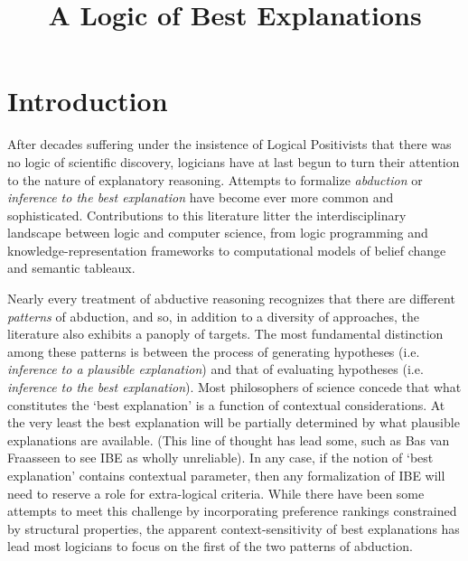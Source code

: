 \documentclass{article}
\theoremstyle{definition}
\theoremstyle{definition}
\theoremstyle{definition}
\theoremstyle{definition}
\theoremstyle{remark}
\theoremstyle{definition}
\theoremstyle{definition}
\begin{document}
\sloppy
\title{A Logic of Best Explanations
}

\large
\raggedbottom

\maketitle

\section{Introduction}

After decades suffering under the insistence of Logical Positivists that there was no logic of scientific discovery, logicians have at last begun to turn their attention to the nature of explanatory reasoning. Attempts to formalize \textit{abduction} or \textit{inference to the best explanation} have become ever more common and sophisticated. Contributions to this literature litter the interdisciplinary landscape between logic and computer science, from logic programming and knowledge-representation frameworks to computational models of belief change and semantic tableaux. 

Nearly every treatment of abductive reasoning recognizes that there are different \textit{patterns} of abduction, and so, in addition to a diversity of approaches, the literature also exhibits a panoply of targets. The most fundamental distinction among these patterns is between the process of generating hypotheses (i.e. \textit{inference to a plausible explanation}) and that of evaluating hypotheses (i.e. \textit{inference to the best explanation}). Most philosophers of science concede that what constitutes the  `best explanation' is a function of contextual considerations.  At the very least the best explanation will be partially determined by what plausible explanations are available. (This line of thought has lead some, such as Bas van Fraasseen to see IBE as wholly unreliable). In any case, if the notion of `best explanation' contains contextual parameter, then any formalization of IBE will need to reserve a role for extra-logical criteria. While there have been some attempts to meet this challenge by incorporating preference rankings constrained by structural properties, the apparent context-sensitivity of best explanations has lead most logicians to focus on the first of the two patterns of abduction. 
\end{document}
